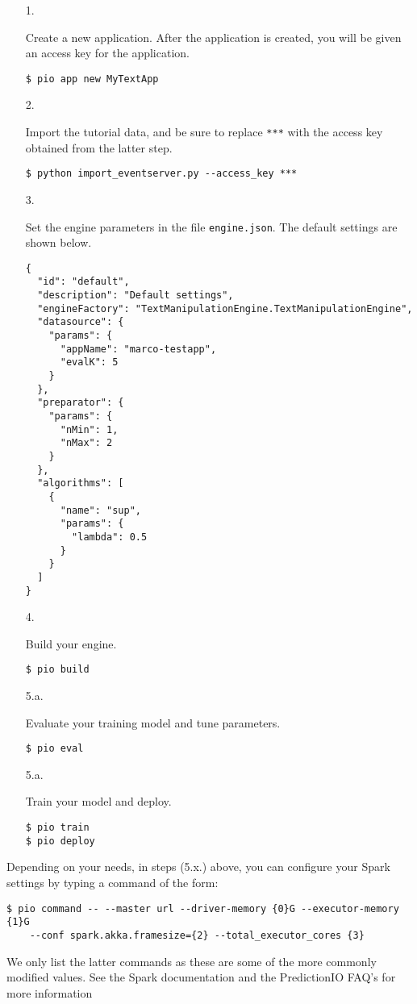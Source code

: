 \documentclass[a4paper,12pt]{article}
\renewcommand{\tt}[1]{\texttt{#1}}
\newcommand{\3}{\left}
\newcommand{\4}{\right}
\renewcommand{\-}[1]{{}^{-#1}}
\begin{document}
\begin{itemize}
\item[1.]{Create a new application. After the application is created, you will be given an access key for the application.
\begin{verbatim}
$ pio app new MyTextApp
\end{verbatim}}

\item[2.]{Import the tutorial data, and be sure to replace \tt{***} with the access key obtained from the latter step.
\begin{verbatim}
$ python import_eventserver.py --access_key ***
\end{verbatim}}

\item[3.]{Set the engine parameters in the file \tt{engine.json}. The default settings are shown below.

\break

\begin{verbatim}
{
  "id": "default",
  "description": "Default settings",
  "engineFactory": "TextManipulationEngine.TextManipulationEngine",
  "datasource": {
    "params": {
      "appName": "marco-testapp",
      "evalK": 5
    }
  },
  "preparator": {
    "params": {
      "nMin": 1,
      "nMax": 2
    }
  },
  "algorithms": [
    {
      "name": "sup",
      "params": {
        "lambda": 0.5
      }
    }
  ]
}
\end{verbatim}}

\item[4.]{Build your engine.
\begin{verbatim}
$ pio build
\end{verbatim}}

\item[5.a.]{Evaluate your training model and tune parameters.
\begin{verbatim}
$ pio eval
\end{verbatim}}

\item[5.a.]{Train your model and deploy.
\begin{verbatim}
$ pio train
$ pio deploy
\end{verbatim}}

\end{itemize}

Depending on your needs, in steps (5.x.) above, you can configure your Spark settings by typing a command of the form:
\begin{verbatim}
$ pio command -- --master url --driver-memory {0}G --executor-memory {1}G 
	--conf spark.akka.framesize={2} --total_executor_cores {3}
\end{verbatim}
We only list the latter commands as these are some of the more commonly modified values. See the Spark documentation
and the PredictionIO FAQ's 
for more information
\end{document}
